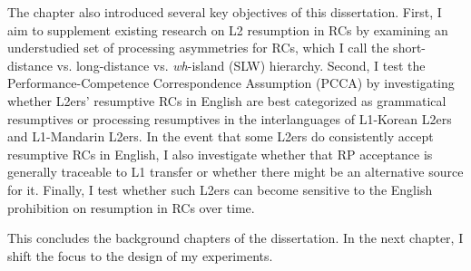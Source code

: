 The chapter also introduced several key objectives of this dissertation. First, I aim to supplement existing research on L2 resumption in RCs by examining an understudied set of processing asymmetries for RCs, which I call the short-distance vs. long-distance vs. \textit{wh}-island (SLW) hierarchy. Second, I test the Performance-Competence Correspondence Assumption (PCCA) by investigating whether L2ers' resumptive RCs in English are best categorized as grammatical resumptives or processing resumptives in the interlanguages of L1-Korean L2ers and L1-Mandarin L2ers. In the event that some L2ers do consistently accept resumptive RCs in English, I also investigate whether that RP acceptance is generally traceable to L1 transfer or whether there might be an alternative source for it. Finally, I test whether such L2ers can become sensitive to the English prohibition on resumption in RCs over time.

This concludes the background chapters of the dissertation. In the next chapter, I shift the focus to the design of my experiments.